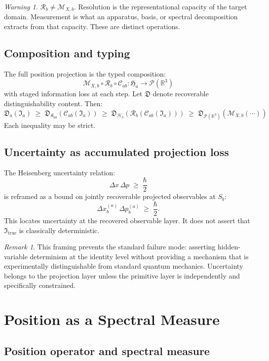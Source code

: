 \documentclass[12pt, a4paper]{article}
\theoremstyle{definition}
\theoremstyle{plain}
\theoremstyle{remark}
\newtheorem{remark}{Remark}[section]
\newtheorem{warning}{Warning}[section]
\newcommand{\Itrue}{\mathfrak{I}_{\mathrm{true}}}
\newcommand{\Ia}{\mathfrak{I}_a}
\newcommand{\Ha}{\mathfrak{H}_a}        %
\newcommand{\Hb}{\mathcal{H}_b}         %
\newcommand{\Kab}{\mathfrak{K}_{ab}}    %
\newcommand{\ProbR}{\mathcal{P}(\mathbb{R}^3)} %
\newcommand{\Sb}{S_b}
\newcommand{\Cab}{\mathcal{C}_{ab}}        %
\newcommand{\Rb}{\mathcal{R}_b}            %
\newcommand{\MXb}{\mathcal{M}_{X,b}}      %
\newcommand{\Dista}{\mathfrak{D}_a}
\begin{document}
\begin{warning}
$\Rb \neq \MXb$.
Resolution is the representational capacity of the target domain.
Measurement is what an apparatus, basis, or spectral decomposition
extracts from that capacity.
These are distinct operations.
\end{warning}

\subsection{Composition and typing}

The full position projection is the typed composition:
\[
  \boxed{\MXb \circ \Rb \circ \Cab : \Ha \to \ProbR}
\]
with staged information loss at each step.
Let $\mathfrak{D}$ denote recoverable distinguishability content.
Then:
\[
  \Dista(\Ia)
  \;\geq\; \mathfrak{D}_{\Kab}(\Cab(\Ia))
  \;\geq\; \mathfrak{D}_{\Hb}(\Rb(\Cab(\Ia)))
  \;\geq\; \mathfrak{D}_{\ProbR}(\MXb(\cdots))
\]
Each inequality may be strict.

\subsection{Uncertainty as accumulated projection loss}

The Heisenberg uncertainty relation:
\[
  \Delta x\,\Delta p \;\geq\; \frac{\hbar}{2}
\]
is reframed as a bound on jointly recoverable projected observables
at $\Sb$:
\[
  \Delta x_b^{(a)}\,\Delta p_b^{(a)} \;\geq\; \frac{\hbar}{2}.
\]
This locates uncertainty at the recovered observable layer.
It does not assert that $\Itrue$ is classically deterministic.

\begin{remark}
This framing prevents the standard failure mode: asserting
hidden-variable determinism at the identity level without providing
a mechanism that is experimentally distinguishable from standard
quantum mechanics.
Uncertainty belongs to the projection layer unless the primitive
layer is independently and specifically constrained.
\end{remark}


\section{Position as a Spectral Measure}
\label{sec:position}

\subsection{Position operator and spectral measure}
\end{document}
